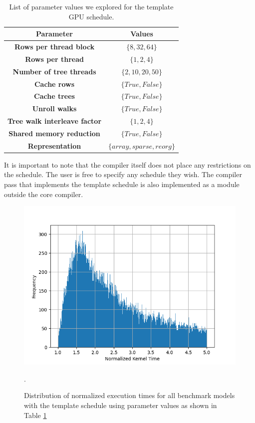 \begin{table}[htb]
  \footnotesize
  \centering
  \begin{tabularx}{\linewidth}{c | c }
    \toprule
    \textbf{Parameter} & \textbf{Values} \\
    \midrule
    \textbf{Rows per thread block} & $\{8, 32, 64\}$ \\
    \textbf{Rows per thread} & $\{1, 2, 4\}$ \\
    \textbf{Number of tree threads} & $\{2, 10, 20, 50\}$ \\
    \textbf{Cache rows} & $\{True, False\}$ \\
    \textbf{Cache trees} & $\{True, False\}$ \\
    \textbf{Unroll walks} & $\{True, False\}$ \\
    \textbf{Tree walk interleave factor} & $\{1, 2, 4\}$ \\
    \textbf{Shared memory reduction} & $\{True, False\}$ \\
    \textbf{Representation} & $\{array, sparse, reorg\}$ \\
    \bottomrule
  \end{tabularx}
  \vskip 5pt
  \caption{\label{tab:schedparams} List of parameter values we explored for the template GPU schedule.}
\end{table}

It is important to note that the \Treebeard{} compiler itself does not place any 
restrictions on the schedule. The user is free to specify any schedule they wish.
The compiler pass that implements the template schedule is also implemented as a 
module outside the core \Treebeard{} compiler. 

\begin{figure}[htb]
  \centering
  \includegraphics[width=0.7\linewidth]{figures/normalized_kernel_histogram_lt5.png}
  \caption{Distribution of normalized execution times for all benchmark models
  with the template schedule using parameter values as shown in Table \ref{tab:schedparams}}. 
  \label{Fig:ExecTimeDistribution}
\end{figure}

